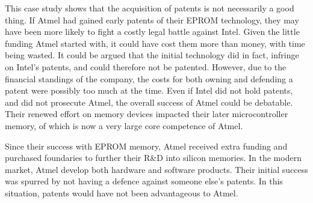 This case study shows that the acquisition of patents is not necessarily a good thing.
If Atmel had gained early patents of their EPROM technology, they may have been more likely to fight a costly legal battle against Intel.
Given the little funding Atmel started with, it could have cost them more than money, with time being wasted. 
It could be argued that the initial technology did in fact, infringe on Intel's patents, and could therefore not be patented.
However, due to the financial standings of the company, the costs for both owning and defending a patent were possibly too much at the time.
Even if Intel did not hold patents, and did not prosecute Atmel, the overall success of Atmel could be debatable. 
Their renewed effort on memory devices impacted their later microcontroller memory, of which is now a very large core competence of Atmel.

Since their success with EPROM memory, Atmel received extra funding \citeneeded and purchased foundaries to further their R\&D into silicon memories. 
In the modern market, Atmel develop both hardware and software products. 
Their initial success was spurred by not having a defence against someone else's patents. 
In this situation, patents would have not been advantageous to Atmel.

